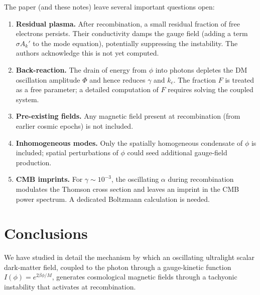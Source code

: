 \documentclass[12pt,a4paper,openany]{book}
\newcommand{\kc}{k_c}
\begin{document}
The paper (and these notes) leave several important questions open:
\begin{enumerate}
  \item \textbf{Residual plasma.} After recombination, a small residual fraction of free electrons persists. Their conductivity damps the gauge field (adding a term $\sigma A_k'$ to the mode equation), potentially suppressing the instability. The authors acknowledge this is not yet computed.
  \item \textbf{Back-reaction.} The drain of energy from $\phi$ into photons depletes the DM oscillation amplitude $\Phi$ and hence reduces $\gamma$ and $\kc$. The fraction $F$ is treated as a free parameter; a detailed computation of $F$ requires solving the coupled system.
  \item \textbf{Pre-existing fields.} Any magnetic field present at recombination (from earlier cosmic epochs) is not included.
  \item \textbf{Inhomogeneous modes.} Only the spatially homogeneous condensate of $\phi$ is included; spatial perturbations of $\phi$ could seed additional gauge-field production.
  \item \textbf{CMB imprints.} For $\gamma \sim 10^{-3}$, the oscillating $\alpha$ during recombination modulates the Thomson cross section and leaves an imprint in the CMB power spectrum. A dedicated Boltzmann calculation is needed.
\end{enumerate}

\chapter{Conclusions}

We have studied in detail the mechanism by which an oscillating ultralight scalar dark-matter field, coupled to the photon through a gauge-kinetic function $I(\phi) = e^{2\beta\phi/M}$, generates cosmological magnetic fields through a tachyonic instability that activates at recombination.
\end{document}
